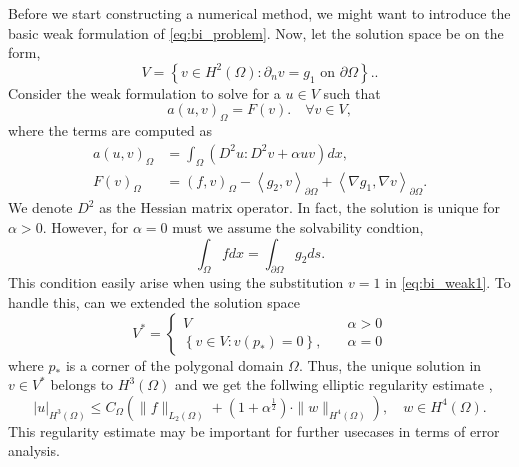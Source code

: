 Before we start constructing a numerical method, we might want to introduce the basic weak formulation of \eqref{eq:bi_problem}. Now, let the solution space be on the form,
\begin{equation*}
V = \left\{ v \in H^2\left( \Omega  \right) : \partial _{n} v = g_{1}  \text{ on }
\partial \Omega  \right\}.
.\end{equation*}
Consider the weak formulation to solve for a $u \in  V$ such that
\begin{equation}
    \label{eq:bi_weak1}
a\left( u,v \right)_{\Omega } = F(v).\quad \forall v \in
V,
\end{equation}
where the terms are computed as \[
    \begin{split}
a\left( u,v \right)_{\Omega } & = \int_{\Omega }^{} \left( D ^2 u : D ^2 v  +
\alpha  u v \right) dx , \\
F\left( v \right)_{\Omega } & = \left( f,v \right)_{\Omega } - \left<g_{2},v \right>_{\partial \Omega } + \left<\nabla g_{1}, \nabla v \right>_{\partial \Omega }.
    \end{split}
\]
We denote $D^2$ as the Hessian matrix operator. In fact, the solution is unique for $\alpha  > 0$. However, for $\alpha  = 0$ must we assume the solvability condtion,
\begin{equation*}
 \int_{\Omega }^{} f dx = \int_{\partial \Omega }^{} g_{2} ds
.\end{equation*}
This condition easily arise when using the substitution $v=1$ in \eqref{eq:bi_weak1}. To handle this, can we extended the solution space \[
V^{*} = \begin{cases}
    V \quad & \alpha  > 0 \\
    \left\{ v \in V: v\left( p_{*} \right)  = 0\right\}, \quad & \alpha  = 0
\end{cases}
\]
where $p_{*}$ is a corner of the polygonal domain $\Omega $.
Thus, the unique solution in $v \in V^{*}$ belongs to $H^{3 }\left( \Omega  \right) $ and we get the follwing
elliptic regularity estimate \cite{gu2012c0},
\begin{equation}
\label{eq:bi_harmonic_ellitpic_regularity}
\left| u \right| _{H^{3 }\left( \Omega  \right) }  \le C_{\Omega } \left( \| f \|_{  L_{2}( \Omega ) }^{  } + ( 1 + \alpha  ^{\frac{1}{2}}
) \cdot \| w  \|_{ H^{4}\left( \Omega  \right)  }^{  }    \right), \quad w\in H^{4}\left( \Omega  \right).
\end{equation}
This regularity estimate may be important for further usecases in terms of error analysis.

